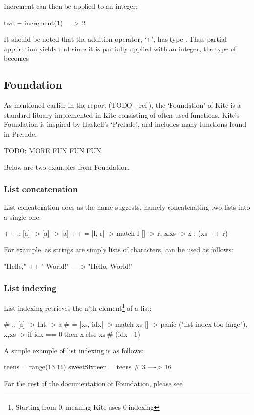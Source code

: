 Increment can then be applied to an integer:

\begin{kite}
  
two = increment(1) ----> 2
\end{kite}


It should be noted that the addition operator, `+', has type . Thus partial application yields  and since it is partially applied with an integer, the type of  becomes 

\subsection{Foundation}

As mentioned earlier in the report (TODO - ref!), the `Foundation' of Kite is a standard library implemented in Kite consisting of often used functions. Kite's Foundation is inspired by Haskell's `Prelude', and includes many functions found in
Prelude. 

TODO: MORE FUN FUN FUN

Below are two examples from Foundation.
\subsubsection{List concatenation}

List concatenation does as the name suggests, namely concatenating two lists into a single one:
\begin{kite}
{++} :: [a] -> [a] -> [a]
{++} = |l, r| -> {
  match l {
    [] -> r,
    x,xs -> x : (xs ++ r)
  }
}
\end{kite}

For example, as strings are simply lists of characters, \code{++} can be used as follows:

\begin{kite}
"Hello," ++ " World!" ----> "Hello, World!"
\end{kite}

\subsubsection{List indexing}

List indexing retrieves the n'th element\footnote{Starting from 0, meaning Kite uses 0-indexing} of a list:
\begin{kite}
{#} :: [a] -> Int -> a
{#} = |xs, idx| -> {
  match xs {
    [] -> panic ("list index too large"),
    x,xs -> if idx == 0 then x else xs # (idx - 1)
  }
}
\end{kite}


A simple example of list indexing is as follows:

\begin{kite}
teens = range(13,19)
sweetSixteen = teens # 3 ----> 16
\end{kite}



For the rest of the documentation of Foundation, please see 

